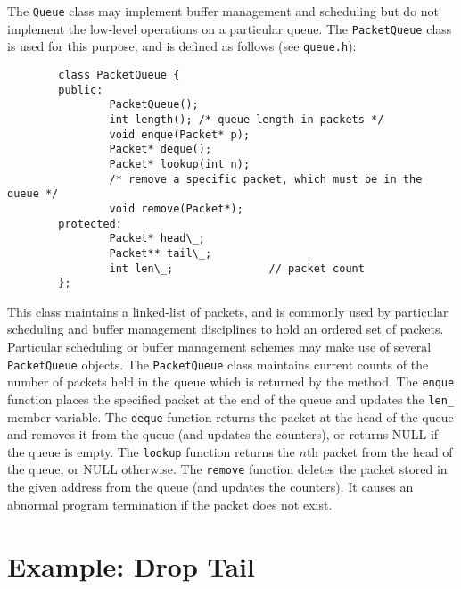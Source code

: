 The {\tt Queue} class may implement buffer management and scheduling but
do not implement the low-level operations on a particular queue.
The {\tt PacketQueue} class is used for this purpose, and is defined as follows
(see {\tt queue.h}):
\begin{verbatim}
        class PacketQueue {
        public:
                PacketQueue();
                int length(); /* queue length in packets */
                void enque(Packet* p);
                Packet* deque();
                Packet* lookup(int n);
                /* remove a specific packet, which must be in the queue */
                void remove(Packet*);
        protected:
                Packet* head\_;
                Packet** tail\_;
                int len\_;               // packet count
        };
\end{verbatim}
This class maintains a linked-list of packets, and is commonly
used by particular scheduling and buffer management disciplines
to hold an ordered set of packets.
Particular scheduling or buffer management schemes may make
use of several {\tt PacketQueue} objects.
The {\tt PacketQueue} class maintains current counts of the number of
packets held in the queue which is returned by the  method.
The {\tt enque} function places the specified packet at the end of
the queue and updates the {\tt len\_} member variable.
The {\tt deque} function returns the packet at the head of the
queue and removes it from the queue (and updates the counters), or
returns NULL if the queue is empty.
The {\tt lookup} function returns the $n$th packet from the head
of the queue, or NULL otherwise.
The {\tt remove} function deletes the packet stored in the given address
from the queue (and updates the counters).
It causes an abnormal program termination if the packet does not exist.

\section{Example: Drop Tail}
\label{sec:droptail}

